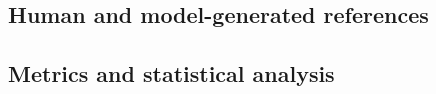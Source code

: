 \documentclass{elektr}
\begin{document}
\subsection*{Human and model-generated references}

\subsection*{Metrics and statistical analysis}
\end{document}
